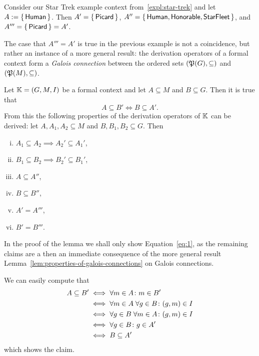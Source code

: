 \begin{Example}
  \label{expl:4}
  Consider our Star Trek example context from~\ref{expl:star-trek} and let $A :=
  {\{\,\mathsf{Human}\,\}}$.  Then $A' = {\{\, \mathsf{Picard} \,\}}$, $A'' = {\{\,
    \mathsf{Human}, \mathsf{Honorable}, \mathsf{Star Fleet} \,\}}$, and $A''' = {\{\,
    \mathsf{Picard} \,\}} = A'$.
\end{Example}

The case that $A''' = A'$ is true in the previous example is not a coincidence, but rather
an instance of a more general result: the derivation operators of a formal context form a
\emph{Galois connection} between the ordered sets $({\mathfrak{P}(G)}, \subseteq)$ and
$({\mathfrak{P}(M)}, \subseteq)$.

\begin{Lemma}
  \label{lem:derivation-is-galois-connection}
  Let ${\mathbb{K}} = (G, M, I)$ be a formal context and let $A \subseteq M$ and $B \subseteq
  G$.  Then it is true that
  \begin{equation}
    \label{eq:1}
    A \subseteq B' \iff B \subseteq A'.
  \end{equation}
  From this the following properties of the derivation operators of ${\mathbb{K}}$ can be
  derived: let $A, A_1, A_2 \subseteq M$ and $B, B_1, B_2 \subseteq G$.  Then
  \begin{enumerate}[i. ]
  \item $A_1 \subseteq A_2 \implies A_2' \subseteq A_1'$,
  \item $B_1 \subseteq B_2 \implies B_2' \subseteq B_1'$,
  \item $A \subseteq A''$,
  \item $B \subseteq B''$,
  \item $A' = A'''$,
  \item $B' = B'''$.
  \end{enumerate}
\end{Lemma}
%
In the proof of the lemma we shall only show Equation~\eqref{eq:1}, as the remaining
claims are a then an immediate consequence of the more general result
Lemma~\ref{lem:properties-of-galois-connections} on Galois connections.
%
\begin{Proof}
  We can easily compute that
  \begin{align*}
    A \subseteq B'
    & \iff \forall m \in A \colon m \in B' \\
    & \iff \forall m \in A \;\forall g \in B \colon (g,m) \in I \\
    & \iff \forall g \in B \;\forall m \in A \colon (g,m) \in I \\
    & \iff \forall g \in B \colon g \in A' \\
    & \iff B \subseteq A'
  \end{align*}
  which shows the claim.
\end{Proof}

